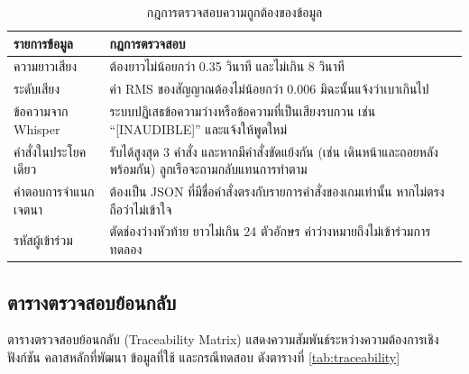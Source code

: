 \begin{table}[!htbp]
\centering
\caption{กฎการตรวจสอบความถูกต้องของข้อมูล}
\label{tab:validation}
\begin{tabular}{|L{3.50cm}|L{10.20cm}|}
\hline
\textbf{รายการข้อมูล} & \textbf{กฎการตรวจสอบ} \\
\hline
ความยาวเสียง & ต้องยาวไม่น้อยกว่า 0.35 วินาที และไม่เกิน 8 วินาที \\ \hline
ระดับเสียง & ค่า RMS ของสัญญาณต้องไม่น้อยกว่า 0.006 มิฉะนั้นแจ้งว่าเบาเกินไป \\ \hline
ข้อความจาก Whisper & ระบบปฏิเสธข้อความว่างหรือข้อความที่เป็นเสียงรบกวน เช่น ``[INAUDIBLE]'' และแจ้งให้พูดใหม่ \\ \hline
คำสั่งในประโยคเดียว & รับได้สูงสุด 3 คำสั่ง และหากมีคำสั่งขัดแย้งกัน (เช่น เดินหน้าและถอยหลังพร้อมกัน) ลูกเรือจะถามกลับแทนการทำตาม \\ \hline
คำตอบการจำแนกเจตนา & ต้องเป็น JSON ที่มีชื่อคำสั่งตรงกับรายการคำสั่งของเกมเท่านั้น หากไม่ตรงถือว่าไม่เข้าใจ \\ \hline
รหัสผู้เข้าร่วม & ตัดช่องว่างหัวท้าย ยาวไม่เกิน 24 ตัวอักษร ค่าว่างหมายถึงไม่เข้าร่วมการทดลอง \\
\hline
\end{tabular}
\end{table}

\subsection{ตารางตรวจสอบย้อนกลับ}

ตารางตรวจสอบย้อนกลับ (Traceability Matrix) แสดงความสัมพันธ์ระหว่างความต้องการเชิงฟังก์ชัน คลาสหลักที่พัฒนา ข้อมูลที่ใช้ และกรณีทดสอบ ดังตารางที่ \ref{tab:traceability}

